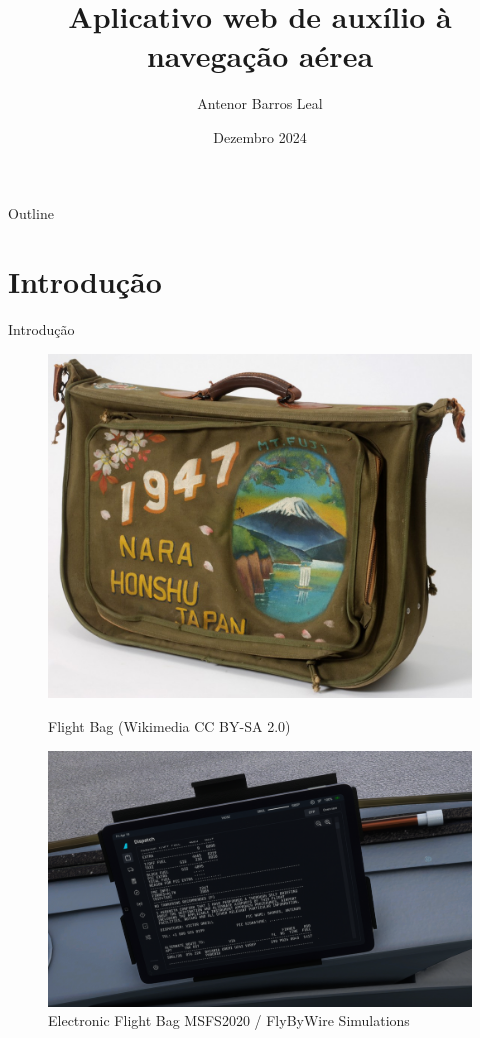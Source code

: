 \documentclass{beamer}
\title{Aplicativo web de auxílio à navegação aérea}
\author{Antenor Barros Leal}
\institute{Departamento de Informática \\ PUC-Rio}
\date{Dezembro 2024}
\begin{document}
\begin{frame}
    \titlepage
\end{frame}

\begin{frame}{Outline}
    \tableofcontents
\end{frame}

\section{Introdução}

\begin{frame}{Introdução}
    \begin{figure}[ht]
        \begin{minipage}[b]{0.45\linewidth}
            \centering
            \includegraphics[width=\textwidth]{img/flight-bag.jpg}
            \caption{Flight Bag (Wikimedia CC BY-SA 2.0)}
        \end{minipage}
        \hspace{0.5cm}
        \pause
        \begin{minipage}[b]{0.45\linewidth}
            \centering
            \includegraphics[width=\textwidth]{img/efb-a320.png}
            \caption{Electronic Flight Bag {MSFS2020 / FlyByWire Simulations}}
        \end{minipage}
    \end{figure}
\end{frame}
\end{document}
